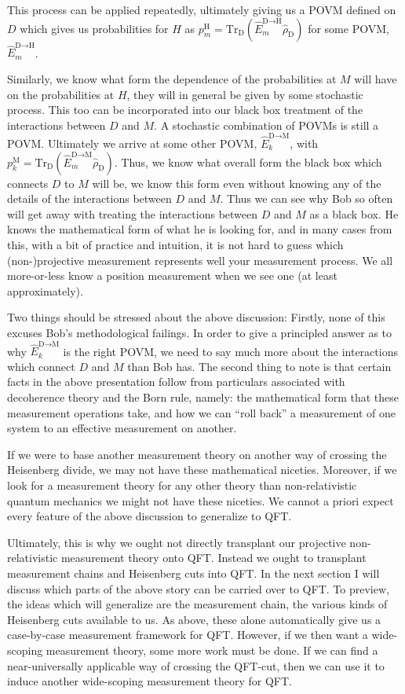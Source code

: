 \documentclass[prd,twocolumn,superscriptaddress,floatfix,amsmath,amssymb,amsfonts,nofootinbib]{revtex4-2}
\begin{document}
This process can be applied repeatedly, ultimately giving us a POVM defined on $D$ which gives us probabilities for $H$ as \mbox{$p_m^\text{H}=\text{Tr}_\text{D}(\hat E_m^{\text{D}\to\text{H}}\hat\rho_\text{D})$} for some POVM, $\hat E_m^{\text{D}\to\text{H}}$.

Similarly, we know what form the dependence of the probabilities at $M$ will have on the probabilities at $H$, they will in general be given by some stochastic process. This too can be incorporated into our black box treatment of the interactions between $D$ and $M$. A stochastic combination of POVMs is still a POVM. Ultimately we arrive at some other POVM, $\hat E_k^{\text{D}\to\text{M}}$, with $p_k^\text{M}=\text{Tr}_\text{D}(\hat E_m^{\text{D}\to\text{M}}\hat\rho_\text{D})$. Thus, we know what overall form the black box which connects $D$ to $M$ will be, we know this form even without knowing any of the details of the interactions between $D$ and $M$. Thus we can see why Bob so often will get away with treating the interactions between $D$ and $M$ as a black box. He knows the mathematical form of what he is looking for, and in many cases from this, with a bit of practice and intuition, it is not hard to guess which (non-)projective measurement represents well your measurement process. We all more-or-less know a position measurement when we see one (at least approximately).

Two things should be stressed about the above discussion: Firstly, none of this excuses Bob's methodological failings. In order to give a principled answer as to why $\hat E_k^{\text{D}\to\text{M}}$ is the right POVM, we need to say much more about the interactions which connect $D$ and $M$ than Bob has. The second thing to note is that certain facts in the above presentation follow from particulars associated with decoherence theory and the Born rule, namely: the mathematical form that these measurement operations take, and how we can ``roll back'' a measurement of one system to an effective measurement on another. 

If we were to base another measurement theory on another way of crossing the Heisenberg divide, we may not have these mathematical niceties. Moreover, if we look for a measurement theory for any other theory than non-relativistic quantum mechanics we might not have these niceties. We cannot a priori expect every feature of the above discussion to generalize to QFT. 

Ultimately, this is why we ought not directly transplant our projective non-relativistic measurement theory onto QFT. Instead we ought to transplant measurement chains and Heisenberg cuts into QFT. In the next section I will discuss which parts of the above story can be carried over to QFT. To preview, the ideas which will generalize are the measurement chain, the various kinds of Heisenberg cuts available to us. As above, these alone automatically give us a case-by-case measurement framework for QFT. However, if we then want a wide-scoping measurement theory, some more work must be done. If we can find a near-universally applicable way of crossing the QFT-cut, then we can use it to induce another wide-scoping measurement theory for QFT. 
\end{document}
